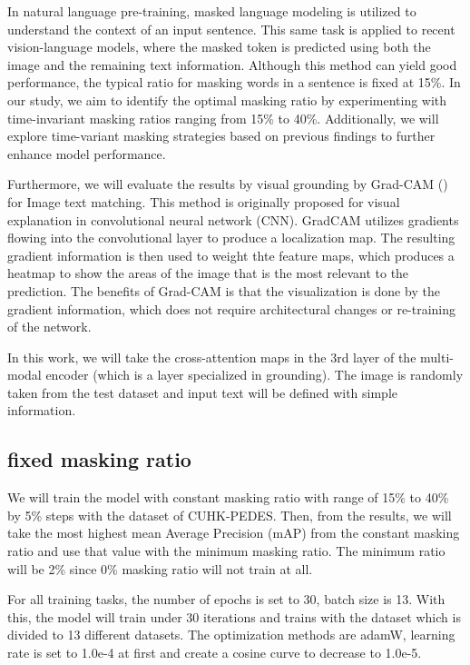 In natural language pre-training, masked language modeling is utilized to understand the context of an input sentence. This same task is applied to recent vision-language models, where the masked token is predicted using both the image and the remaining text information. Although this method can yield good performance, the typical ratio for masking words in a sentence is fixed at 15\%. In our study, we aim to identify the optimal masking ratio by experimenting with time-invariant masking ratios ranging from 15\% to 40\%. Additionally, we will explore time-variant masking strategies based on previous findings to further enhance model performance.

Furthermore, we will evaluate the results by visual grounding by Grad-CAM (\cite{gradcam}) for Image text matching. This method is originally proposed for visual explanation in convolutional neural network (CNN). GradCAM utilizes gradients flowing into the convolutional layer to produce a localization map. The resulting gradient information is then used to weight thte feature maps, which produces a heatmap to show the areas of the image that is the most relevant to the prediction. The benefits of Grad-CAM is that the visualization is done by the gradient information, which does not require architectural changes or re-training of the network.

In this work, we will take the cross-attention maps in the 3rd layer of the multi-modal encoder (which is a layer specialized in grounding). The image is randomly taken from the test dataset and input text will be defined with simple information.

\subsection{fixed masking ratio}
We will train the model with constant masking ratio with range of 15\% to 40\% by 5\% steps with the dataset of CUHK-PEDES. Then, from the results, we will take the most highest mean Average Precision (mAP) from the constant masking ratio and use that value with the minimum masking ratio. The minimum ratio will be 2\% since 0\% masking ratio will not train at all. 

For all training tasks, the number of epochs is set to 30, batch size is 13. With this, the model will train under 30 iterations and trains with the dataset which is divided to 13 different datasets. The optimization methods are adamW, learning rate is set to 1.0e-4 at first and create a cosine curve to decrease to 1.0e-5. 

